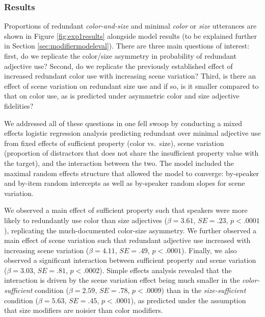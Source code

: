 \documentclass[11pt]{article}
\newcommand{\jd}[1]{\textcolor{Red}{[jd: #1]}}
\newcommand{\figref}[1]{Figure \ref{#1}}
\newcommand{\sectionref}[1]{Section \ref{#1}}
\begin{document}

\subsubsection{Results}
\label{sec:modelempiricalresults}

Proportions of redundant \emph{color-and-size} and minimal \emph{color} or \emph{size} utterances are shown in \figref{fig:exp1results} alongside model results (to be explained further in \sectionref{sec:modifiermodeleval}). There are three main questions of interest: first, do we replicate the color/size asymmetry in probability of redundant adjective use? Second, do we replicate the previously established effect of increased redundant color use with increasing scene variation? Third, is there an effect of scene variation on redundant size use and if so, is it smaller compared to that on color use, as is predicted under asymmetric color and size adjective fidelities?

We addressed all of these questions in one fell swoop by conducting a mixed effects logistic regression analysis predicting redundant over minimal adjective use from fixed effects of sufficient property (color vs.~size), scene variation (proportion of distractors that does not share the insufficient property value with the target), and the interaction between the two. The model included the maximal random effects structure that allowed the model to converge: by-speaker and by-item random intercepts as well as by-speaker random slopes for scene variation. 

We observed a main effect of sufficient property such that speakers were more likely to redundantly use color than size adjectives ($\beta = 3.61$, $SE = .23$, $p < .0001$), replicating the much-documented color-size asymmetry. We further observed a main effect of scene variation such that redundant adjective use increased with increasing scene variation ($\beta = 4.11$, $SE = .49$, $p < .0001$). Finally, we also observed a significant interaction between sufficient property and scene variation ($\beta = 3.03$, $SE = .81$, $p < .0002$). Simple effects analysis revealed that the interaction is driven by the scene variation effect being much smaller in the \emph{color-sufficient} condition ($\beta = 2.59$, $SE = .78$, $p < .0009$) than in the \emph{size-sufficient} condition ($\beta = 5.63$, $SE = .45$, $p < .0001$), as predicted under the assumption that size modifiers are noisier than color modifiers.
\end{document}
